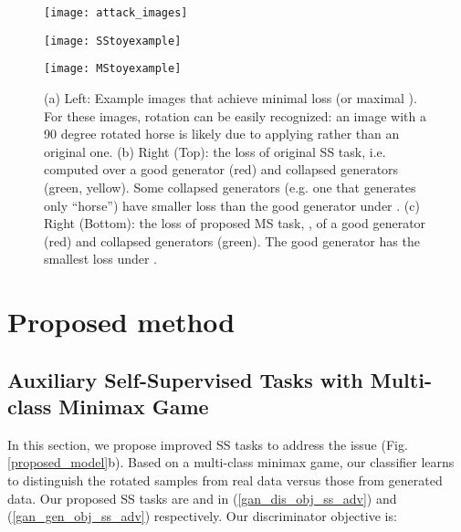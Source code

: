 \documentclass{article}
\begin{document}
\begin{figure}
  \begin{minipage}[c]{0.26\textwidth}
          \begin{flushright}
          \texttt{[image: attack\_images]}
          \end{flushright}
  \end{minipage}
  \begin{minipage}[c]{0.70\textwidth}
          \begin{center}
          \texttt{[image: SStoyexample]}
          \vspace{-0.8cm}
          \end{center}
          \begin{center}
          \texttt{[image: MStoyexample]}
          \end{center}
  \end{minipage}
  \caption{(a) Left: Example images that achieve minimal loss (or maximal ). For these images, rotation can be easily recognized: an image with a 90 degree rotated horse is likely due to applying  rather than an original one. (b) Right (Top): the loss of original SS task, i.e.  computed over a good generator (red) and collapsed generators (green, yellow). 
  Some collapsed generators (e.g. one that generates only ``horse'') have smaller loss than the good generator under .
  (c) Right (Bottom): the loss of proposed MS task, , of a good generator (red) and collapsed generators (green). The good generator has the smallest loss under .
  }
  \label{classifiion_theorem_1}
\end{figure}




\section{Proposed method}
\label{proposed_method}

\subsection{Auxiliary Self-Supervised Tasks with Multi-class Minimax Game}

In this section, we propose improved SS tasks to address the issue (Fig. \ref{proposed_model}b).
Based on a multi-class minimax game, our classifier learns to distinguish the rotated samples from real data versus those from generated data. 
Our proposed SS tasks are  
 and  in (\ref{gan_dis_obj_ss_adv}) and (\ref{gan_gen_obj_ss_adv}) respectively.
Our discriminator objective is: 
\end{document}
